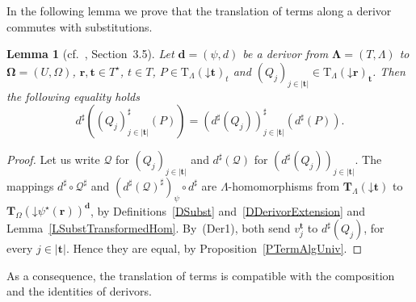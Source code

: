 \documentclass[a4paper, reqno]{amsbook}
\newcommand{\bb}[1]{\ensuremath{\lvert #1 \rvert}}
\newcommand{\vs}[1]{\mathbin{\downarrow}#1}
\newcommand{\sig}[1]{\mathbf{#1}}             %
\theoremstyle{plain}
\newtheorem{lemma}[theorem]{Lemma}
\theoremstyle{definition}
\begin{document}
In the following lemma we prove that the translation of terms along a derivor commutes with substitutions.

\begin{lemma}[cf.~\cite{Soliveres2000}, Section~3.5]\label{LDerivorSubst}
Let $\mathbf{d}=(\psi,d)$ be a derivor from $\sig{\Lambda}=(T,\Lambda)$ to $\sig{\Omega}=(U,\Omega)$, $\mathbf{r},\mathbf{t}\in T^{\star}$, $t\in T$, $P\in\mathrm{T}_{\Lambda}(\vs{\mathbf{t}})_{t}$ and $(Q_{j})_{j\in\bb{\mathbf{t}}}\in\mathrm{T}_{\Lambda}(\vs{\mathbf{r}})_{\mathbf{t}}$.
Then the following equality holds
$$
d^{\sharp}\left((Q_{j})^{\sharp}_{j\in\bb{\mathbf{t}}}(P)\right)=\left(d^{\sharp}(Q_{j})\right)^{\sharp}_{j\in\bb{\mathbf{t}}}\left(d^{\sharp}(P)\right).
$$
\end{lemma}
\begin{proof}
Let us write $\mathcal{Q}$ for $(Q_{j})_{j\in\bb{\mathbf{t}}}$ and $d^{\sharp}(\mathcal{Q})$ for $(d^{\sharp}(Q_{j}))_{j\in\bb{\mathbf{t}}}$.
The mappings $d^{\sharp}\circ\mathcal{Q}^{\sharp}$ and $(d^{\sharp}(\mathcal{Q})^{\sharp})_{\psi}\circ d^{\sharp}$ are $\Lambda$-homomorphisms from $\mathbf{T}_{\Lambda}(\vs{\mathbf{t}})$ to $\mathbf{T}_{\Omega}(\vs{\psi^{\star}(\mathbf{r})})^{\mathbf{d}}$, by Definitions~\ref{DSubst} and~\ref{DDerivorExtension} and Lemma~\ref{LSubstTransformedHom}.
By~(Der1), both send $v^{\mathbf{t}}_{j}$ to $d^{\sharp}(Q_{j})$, for every $j\in\bb{\mathbf{t}}$.
Hence they are equal, by Proposition~\ref{PTermAlgUniv}.
\end{proof}

As a consequence, the translation of terms is compatible with the composition and the identities of derivors.
\end{document}
